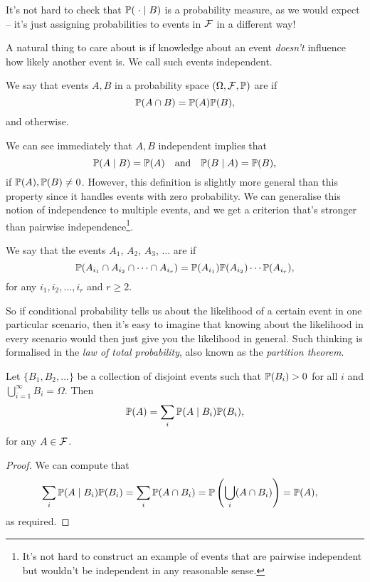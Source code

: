 \documentclass[a4paper]{scrartcl}
\begin{document}
It's not hard to check that $\mathbb{P}(\; \cdot \mid B)$ is a probability measure, as we would expect -- it's just assigning probabilities to events in $\mathcal{F}$ in a different way!

A natural thing to care about is if knowledge about an event \emph{doesn't} influence how likely another event is. We call such events independent.

\begin{definition}
We say that events $A, B$ in a probability space $(\Omega, \mathcal{F}, \mathbb{P})$ are  if
$$
\mathbb{P}(A \cap B) = \mathbb{P}(A) \mathbb{P}(B),
$$
and  otherwise.
\end{definition}

We can see immediately that $A, B$ independent implies that
$$
\mathbb{P}(A \mid B) = \mathbb{P}(A) \quad \text{and} \quad \mathbb{P}(B \mid A) = \mathbb{P}(B),
$$
if $\mathbb{P}(A), \mathbb{P}(B) \neq 0$. However, this definition is slightly more general than this property since it handles events with zero probability.
We can generalise this notion of independence to multiple events, and we get a criterion that's stronger than pairwise independence\footnote{It's not hard to construct an example of events that are pairwise independent but wouldn't be independent in any reasonable sense.}.

\begin{definition}
	We say that the events $A_1$, $A_2$, $A_3$, $\dots$ are  if
	$$
	\mathbb{P}(A_{i_1} \cap A_{i_2} \cap \cdots \cap A_{i_r}) = \mathbb{P}(A_{i_1}) \mathbb{P}(A_{i_2}) \cdots \mathbb{P}(A_{i_r}),
	$$
	for any $i_1, i_2, \dots, i_r$ and $r \geq 2$.
\end{definition}

So if conditional probability tells us about the likelihood of a certain event in one particular scenario, then it's easy to imagine that knowing about the likelihood in every scenario would then just give you the likelihood in general. Such thinking is formalised in the \emph{law of total probability}, also known as the \emph{partition theorem}.

\begin{theorem}
	Let $\{B_1, B_2, \dots\}$ be a collection of disjoint events such that $\mathbb{P}(B_i) > 0$ for all $i$ and $\bigcup_{i = 1}^{\infty} B_i = \Omega$. Then
	$$
	\mathbb{P}(A) = \sum_i \mathbb{P}(A \mid B_i) \mathbb{P}(B_i),
	$$
	for any $A \in \mathcal{F}$.
\end{theorem}
\begin{proof}
	We can compute that
	\begin{align*}
		\sum_{i} \mathbb{P}(A \mid B_i) \mathbb{P}(B_i) &= \sum_i \mathbb{P}(A \cap B_i) = \mathbb{P}\left(\bigcup_i (A \cap B_i)\right) = \mathbb{P}(A),
	\end{align*}
	as required.
\end{proof}
\end{document}
